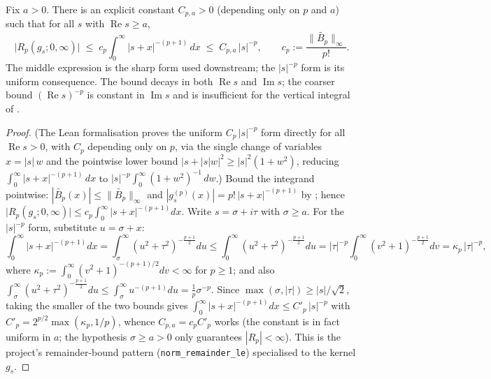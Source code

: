 \begin{lemma}
\label{lem:gs_remainder_bound}
\leanok
{}
Fix $a>0$. There is an explicit constant $C_{p,a}>0$ (depending only on $p$ and
$a$) such that for all $s$ with $\operatorname{Re}s\ge a$,
\[
  \bigl|R_p(g_s;0,\infty)\bigr|
  \;\le\; c_p\int_0^{\infty}\lvert s+x\rvert^{-(p+1)}\,dx
  \;\le\; C_{p,a}\,\lvert s\rvert^{-p},
  \qquad c_p:=\frac{\|\widetilde{B_p}\|_\infty}{p!}.
\]
The middle expression is the sharp form used downstream; the
$\lvert s\rvert^{-p}$ form is its uniform consequence. The bound decays in both
$\operatorname{Re}s$ and $\operatorname{Im}s$; the coarser bound
$(\operatorname{Re}s)^{-p}$ is constant in $\operatorname{Im}s$ and is insufficient
for the vertical integral of .
\end{lemma}

\begin{proof}
\leanok
{}
(The Lean formalisation proves the uniform $C_p\,\lvert s\rvert^{-p}$ form directly for all
$\operatorname{Re}s>0$, with $C_p$ depending only on $p$, via the single change of variables
$x=\lvert s\rvert\,w$ and the pointwise lower bound
$\lvert s+\lvert s\rvert w\rvert^{2}\ge\lvert s\rvert^{2}(1+w^{2})$, reducing
$\int_0^\infty\lvert s+x\rvert^{-(p+1)}\,dx$ to
$\lvert s\rvert^{-p}\int_0^\infty(1+w^{2})^{-1}\,dw$.)
Bound the integrand pointwise: $|\widetilde{B_p}(x)|\le\|\widetilde{B_p}\|_\infty$
and $|g_s^{(p)}(x)|=p!\,|s+x|^{-(p+1)}$ by ; hence
$\bigl|R_p(g_s;0,\infty)\bigr|\le c_p\int_0^\infty|s+x|^{-(p+1)}dx$. Write
$s=\sigma+i\tau$ with $\sigma\ge a$. For the $|s|^{-p}$ form, substitute
$u=\sigma+x$:
\[
  \int_0^\infty|s+x|^{-(p+1)}dx
  =\int_\sigma^\infty(u^2+\tau^2)^{-\frac{p+1}{2}}du
  \le \int_0^\infty(u^2+\tau^2)^{-\frac{p+1}{2}}du
  = |\tau|^{-p}\!\int_0^\infty(v^2+1)^{-\frac{p+1}{2}}dv = \kappa_p\,|\tau|^{-p},
\]
where $\kappa_p:=\int_0^\infty(v^2+1)^{-(p+1)/2}dv<\infty$ for $p\ge1$; and also
$\int_\sigma^\infty(u^2+\tau^2)^{-\frac{p+1}{2}}du\le\int_\sigma^\infty u^{-(p+1)}du
=\frac1p\sigma^{-p}$. Since $\max(\sigma,|\tau|)\ge|s|/\sqrt2$, taking the smaller of
the two bounds gives $\int_0^\infty|s+x|^{-(p+1)}dx\le C'_p\,|s|^{-p}$ with
$C'_p=2^{p/2}\max(\kappa_p,1/p)$, whence $C_{p,a}=c_pC'_p$ works (the constant is in
fact uniform in $a$; the hypothesis $\sigma\ge a>0$ only guarantees
$|R_p|<\infty$). This is the project's remainder-bound pattern
(\texttt{norm\_remainder\_le}) specialised to the kernel $g_s$.
\end{proof}

